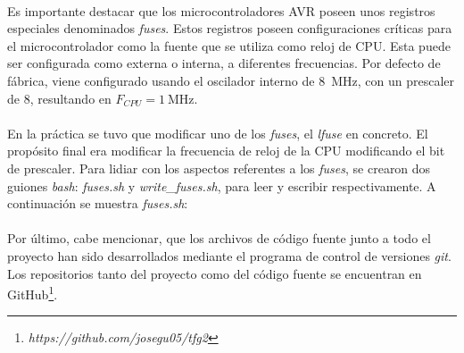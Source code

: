 

\paragraph{}
Es importante destacar que los microcontroladores AVR poseen unos registros especiales denominados \textit{fuses}.
Estos registros poseen configuraciones cr\'iticas para el microcontrolador como la fuente que se utiliza como reloj de CPU. Esta puede ser configurada como externa o interna, a diferentes frecuencias. Por defecto de fábrica, viene configurado usando el oscilador interno de \SI{8}{\mega\hertz}, con un prescaler de 8, resultando en $F_{CPU} = \SI{1}{\mega\hertz}$.
\paragraph{}
En la pr\'actica se tuvo que modificar uno de los \textit{fuses}, el \textit{lfuse} en concreto. El prop\'osito final era modificar la frecuencia de reloj de la CPU modificando el bit de prescaler.
Para lidiar con los aspectos referentes a los \textit{fuses}, se crearon dos guiones \textit{bash}: \textit{fuses.sh} y \textit{write\_fuses.sh}, para leer y escribir respectivamente. A continuaci\'on se muestra \textit{fuses.sh}:


\paragraph{}
Por último, cabe mencionar, que los archivos de código fuente junto a todo el proyecto han sido desarrollados mediante el programa de control de versiones \textit{git}. 
Los repositorios tanto del proyecto como del código fuente se encuentran en GitHub\footnote{\textit{https://github.com/josegu05/tfg2}}.


